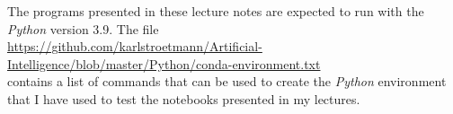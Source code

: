 \remark
The programs presented in these lecture notes are expected to run with the \textsl{Python} version 3.9.
The file 
\\[0.2cm]
\hspace*{-0.3cm}
\href{https://github.com/karlstroetmann/Artificial-Intelligence/blob/master/Python/conda-environment.txt}{https://github.com/karlstroetmann/Artificial-Intelligence/blob/master/Python/conda-environment.txt}
\\[0.2cm]
contains a list of commands that can be used to create the \textsl{Python} environment that I have used to test
the notebooks presented in my lectures.  

